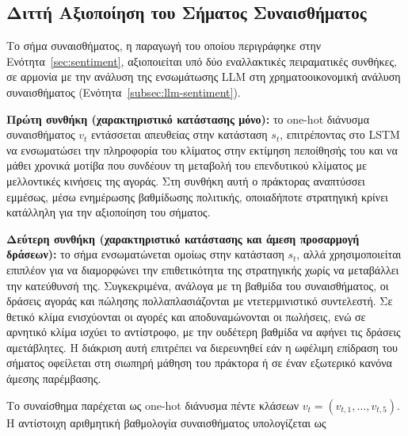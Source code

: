 \subsection{Διττή Αξιοποίηση του Σήματος Συναισθήματος}
\label{sec:dualsentiment}

Το σήμα συναισθήματος, η παραγωγή του οποίου περιγράφηκε στην
Ενότητα~\ref{sec:sentiment}, αξιοποιείται υπό δύο εναλλακτικές πειραματικές
συνθήκες, σε αρμονία με την ανάλυση της ενσωμάτωσης LLM στη χρηματοοικονομική
ανάλυση συναισθήματος (Ενότητα~\ref{subsec:llm-sentiment}).

\textbf{Πρώτη συνθήκη (χαρακτηριστικό κατάστασης μόνο):} το one-hot διάνυσμα
συναισθήματος $v_t$ εντάσσεται απευθείας στην κατάσταση $s_t$, επιτρέποντας
στο LSTM να ενσωματώσει την πληροφορία του κλίματος στην εκτίμηση πεποίθησής
του και να μάθει χρονικά μοτίβα που συνδέουν τη μεταβολή του επενδυτικού
κλίματος με μελλοντικές κινήσεις της αγοράς. Στη συνθήκη αυτή ο πράκτορας
αναπτύσσει εμμέσως, μέσω ενημέρωσης βαθμίδωσης πολιτικής, οποιαδήποτε
στρατηγική κρίνει κατάλληλη για την αξιοποίηση του σήματος.

\textbf{Δεύτερη συνθήκη (χαρακτηριστικό κατάστασης και άμεση προσαρμογή
δράσεων):} το σήμα ενσωματώνεται ομοίως στην κατάσταση $s_t$, αλλά
χρησιμοποιείται επιπλέον για να διαμορφώνει την επιθετικότητα της στρατηγικής
χωρίς να μεταβάλλει την κατεύθυνσή της. Συγκεκριμένα, ανάλογα με τη βαθμίδα
του συναισθήματος, οι δράσεις αγοράς και πώλησης πολλαπλασιάζονται με
ντετερμινιστικό συντελεστή. Σε θετικό κλίμα ενισχύονται οι αγορές και
αποδυναμώνονται οι πωλήσεις, ενώ σε αρνητικό κλίμα ισχύει το αντίστροφο, με
την ουδέτερη βαθμίδα να αφήνει τις δράσεις αμετάβλητες. Η διάκριση αυτή
επιτρέπει να διερευνηθεί εάν η ωφέλιμη επίδραση του σήματος οφείλεται στη
σιωπηρή μάθηση του πράκτορα ή σε έναν εξωτερικό κανόνα άμεσης παρέμβασης.

Το συναίσθημα παρέχεται ως one-hot διάνυσμα πέντε κλάσεων
$v_t=(v_{t,1},\ldots,v_{t,5})$. Η αντίστοιχη αριθμητική βαθμολογία
συναισθήματος υπολογίζεται ως

